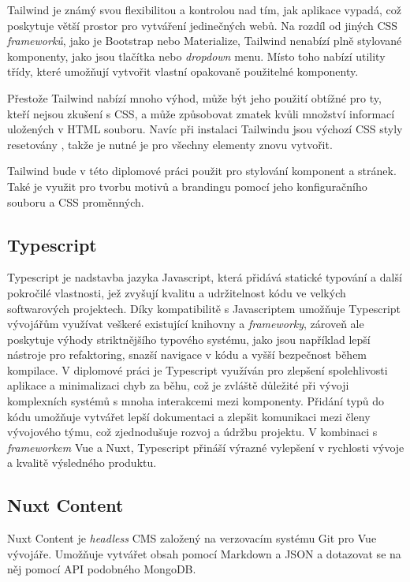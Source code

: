 Tailwind je známý svou flexibilitou a kontrolou nad tím, jak aplikace vypadá, což poskytuje větší prostor pro vytváření jedinečných webů. Na rozdíl od jiných CSS \emph{frameworků}, jako je Bootstrap nebo Materialize, Tailwind nenabízí plně stylované komponenty, jako jsou tlačítka nebo \emph{dropdown} menu. Místo toho nabízí utility třídy, které umožňují vytvořit vlastní opakovaně použitelné komponenty.

Přestože Tailwind nabízí mnoho výhod, může být jeho použití obtížné pro ty, kteří nejsou zkušení s CSS, a může způsobovat zmatek kvůli množství informací uložených v HTML souboru. Navíc při instalaci Tailwindu jsou výchozí CSS styly resetovány \cite{TailwindPreflight}, takže je nutné je pro všechny elementy znovu vytvořit.

Tailwind bude v této diplomové práci použit pro stylování komponent a stránek. Také je využit pro tvorbu motivů a brandingu pomocí jeho konfiguračního souboru a CSS proměnných.

\subsection{Typescript}
Typescript je nadstavba jazyka Javascript, která přidává statické typování a další pokročilé vlastnosti, jež zvyšují kvalitu a udržitelnost kódu ve velkých softwarových projektech. Díky kompatibilitě s Javascriptem umožňuje Typescript vývojářům využívat veškeré existující knihovny a \emph{frameworky}, zároveň ale poskytuje výhody striktnějšího typového systému, jako jsou například lepší nástroje pro refaktoring, snazší navigace v kódu a vyšší bezpečnost během kompilace. V diplomové práci je Typescript využíván pro zlepšení spolehlivosti aplikace a minimalizaci chyb za běhu, což je zvláště důležité při vývoji komplexních systémů s mnoha interakcemi mezi komponenty. Přidání typů do kódu umožňuje vytvářet lepší dokumentaci a zlepšit komunikaci mezi členy vývojového týmu, což zjednodušuje rozvoj a údržbu projektu. V kombinaci s \emph{frameworkem} Vue a Nuxt, Typescript přináší výrazné vylepšení v rychlosti vývoje a kvalitě výsledného produktu. \cite{Typescript}


\subsection{Nuxt Content}
Nuxt Content je \emph{headless} CMS založený na verzovacím systému Git pro Vue vývojáře. Umožňuje vytvářet obsah pomocí Markdown a JSON a dotazovat se na něj pomocí API podobného MongoDB. \cite{NuxtContent}

